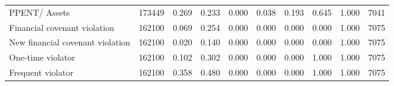 \begin{table}[ht]
{\begin{tabular}{lrrrrrrrrr}
  PPENT/ Assets & 173449 & 0.269 & 0.233 & 0.000 & 0.038 & 0.193 & 0.645 & 1.000 & 7041 \\ 
  Financial covenant violation & 162100 & 0.069 & 0.254 & 0.000 & 0.000 & 0.000 & 0.000 & 1.000 & 7075 \\ 
  New financial covenant violation & 162100 & 0.020 & 0.140 & 0.000 & 0.000 & 0.000 & 0.000 & 1.000 & 7075 \\ 
  One-time violator & 162100 & 0.102 & 0.302 & 0.000 & 0.000 & 0.000 & 1.000 & 1.000 & 7075 \\ 
  Frequent violator & 162100 & 0.358 & 0.480 & 0.000 & 0.000 & 0.000 & 1.000 & 1.000 & 7075 \\ 
   \hline
\end{tabular}}
\end{table}
